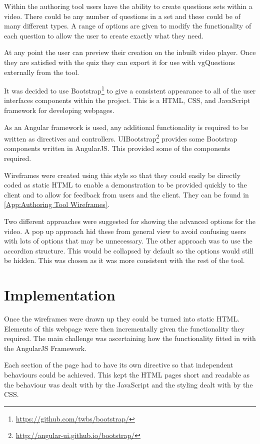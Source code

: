 Within the authoring tool users have the ability to create questions sets within a video. There could be any number of questions in a set and these could be of many different types. A range of options are given to modify the functionality of each question to allow the user to create exactly what they need.

At any point the user can preview their creation on the inbuilt video player. Once they are satisfied with the quiz they can export it for use with \gls{vgQuestions} externally from the tool.

It was decided to use Bootstrap\footnote{\url{https://github.com/twbs/bootstrap/}} to give a consistent appearance to all of the user interfaces components within the project. This is a HTML, \gls{CSS}, and JavaScript framework for developing webpages.

As an Angular framework is used, any additional functionality is required to be written as directives and controllers. UIBootstrap\footnote{\url{http://angular-ui.github.io/bootstrap/}} provides some Bootstrap components written in \gls{AngularJS}. This provided some of the components required. 

Wireframes were created using this style so that they could easily be directly coded as static HTML to enable a demonstration to be provided quickly to the client and to allow for feedback from users and the client. They can be found in \cref{App:Authoring Tool Wireframes}.

Two different approaches were suggested for showing the advanced options for the video. A pop up approach hid these from general view to avoid confusing users with lots of options that may be unnecessary. The other approach was to use the accordion structure. This would be collapsed by default so the options would still be hidden. This was chosen as it was more consistent with the rest of the tool. 

\section{Implementation}
\label{Section:Authoring_Implementation}
Once the wireframes were drawn up they could be turned into static HTML. Elements of this webpage were then incrementally given the functionality they required. The main challenge was ascertaining how the functionality fitted in with the \gls{AngularJS} Framework. 

Each section of the page had to have its own directive so that independent behaviours could be achieved. This kept the HTML pages short and readable as the behaviour was dealt with by the JavaScript and the styling dealt with by the \gls{CSS}.

